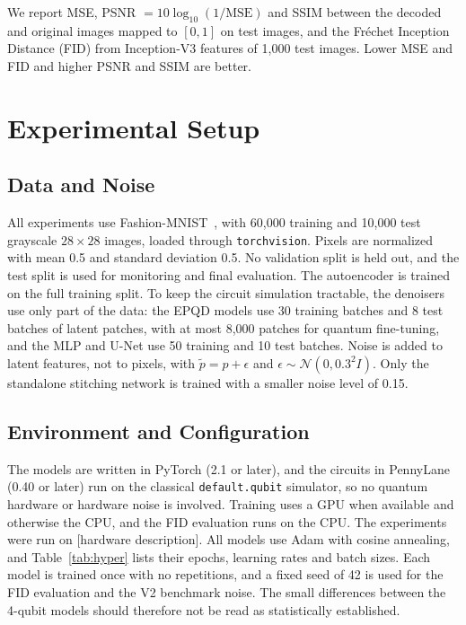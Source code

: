\documentclass[runningheads]{llncs}
\begin{document}
We report MSE, PSNR $=10\log_{10}(1/\mathrm{MSE})$ and SSIM between the decoded and original images mapped to $[0,1]$ on test images, and the Fr\'echet Inception Distance (FID) from Inception-V3 features of 1{,}000 test images. Lower MSE and FID and higher PSNR and SSIM are better.

\section{Experimental Setup}\label{sec:setup}

\subsection{Data and Noise}
All experiments use Fashion-MNIST~\cite{fmnist}, with 60{,}000 training and 10{,}000 test grayscale $28\times28$ images, loaded through \texttt{torchvision}. Pixels are normalized with mean 0.5 and standard deviation 0.5. No validation split is held out, and the test split is used for monitoring and final evaluation. The autoencoder is trained on the full training split. To keep the circuit simulation tractable, the denoisers use only part of the data: the EPQD models use 30 training batches and 8 test batches of latent patches, with at most 8{,}000 patches for quantum fine-tuning, and the MLP and U-Net use 50 training and 10 test batches. Noise is added to latent features, not to pixels, with $\tilde p=p+\epsilon$ and $\epsilon\sim\mathcal{N}(0,0.3^2I)$. Only the standalone stitching network is trained with a smaller noise level of 0.15.

\subsection{Environment and Configuration}
The models are written in PyTorch (2.1 or later), and the circuits in PennyLane (0.40 or later) run on the classical \texttt{default.qubit} simulator, so no quantum hardware or hardware noise is involved. Training uses a GPU when available and otherwise the CPU, and the FID evaluation runs on the CPU. The experiments were run on [hardware description]. All models use Adam with cosine annealing, and Table~\ref{tab:hyper} lists their epochs, learning rates and batch sizes. Each model is trained once with no repetitions, and a fixed seed of 42 is used for the FID evaluation and the V2 benchmark noise. The small differences between the 4-qubit models should therefore not be read as statistically established.
\end{document}
